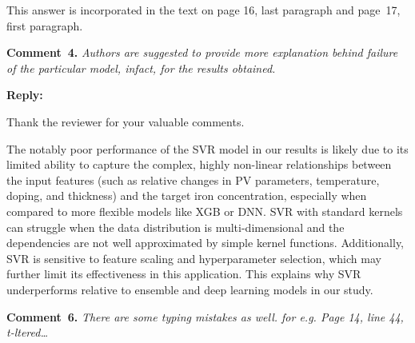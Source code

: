 \documentclass[a4paper,fleqn]{cas-sc}
\begin{document}
This answer is incorporated in the text on page 16, last paragraph and page~17, first paragraph.


\textcolor[rgb]{1.00,0.07,0.00}{
\hl{}}


\vspace{1cm}
\noindent
\textcolor[rgb]{0.00,0.50,1.00}{\textbf{Comment~4.}}
\emph{Authors are suggested to provide more explanation behind failure of the particular model, infact, for the results obtained.}

\noindent
\textcolor[rgb]{0.51,0.00,0.00}{\textbf{Reply:}}

Thank the reviewer for your valuable comments.



The notably poor performance of the SVR model in our results is likely due to its limited ability to capture the complex, 
highly non-linear relationships between the input features (such as relative changes in PV parameters, temperature, doping, and thickness) and the target iron concentration, 
especially when compared to more flexible models like XGB or DNN.
SVR with standard kernels can struggle when the data distribution is multi-dimensional and the dependencies are not well approximated by simple kernel functions.
Additionally, SVR is sensitive to feature scaling and hyperparameter selection, which may further limit its effectiveness in this application.
This explains why SVR underperforms relative to ensemble and deep learning models in our study.

%
%
%
%
\vspace{1cm}
\noindent
\textcolor[rgb]{0.00,0.50,1.00}{\textbf{Comment~6.}}
\emph{There are some typing mistakes as well. for e.g. Page 14, line 44, t-ltered…}
\end{document}
